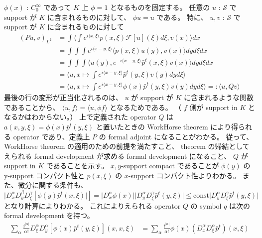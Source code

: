 \begin{Proof}
\itemprof
  \(\phi(x)\) : \(C^\infty_0\) であって \(K\) 上 \(\phi = 1\) となるものを固定する。
  任意の \(u\) : \(\mathscr{S}\) で support が \(K\) に含まれるものに対して、 \(\phi u = u\) である。
  特に、 \(u,v\) : \(\mathscr{S}\) で support が \(K\) に含まれるものに対して
  \begin{align*}
    (Pu , v)_{L^2}
    &= \int \langle \int e^{i \langle x , \xi \rangle} p(x , \xi) \mathscr{F}[u](\xi) d\xi , v(x) \rangle dx \\
    &= \int \int \int e^{i \langle x - y , \xi \rangle} \langle p(x , \xi) u(y) , v(x) \rangle dy d\xi dx \\
    &= \int \int \int \langle u(y) , e^{- i \langle x - y , \xi \rangle} \bar{p}^t(x,\xi) v(x) \rangle dy d\xi dx \\
    &= \langle u , x \mapsto \int e^{i \langle x - y , \xi \rangle} \bar{p}^t(y,\xi) v(y) dy d\xi \rangle \\
    &= \langle u , x \mapsto \int e^{i \langle x - y , \xi \rangle} \phi(x) \bar{p}^t(y,\xi) v(y) dy d\xi \rangle
    =: \langle u , Q v \rangle
  \end{align*}
  最後の行の変形が正当化されるのは、 \(u\) が support が \(K\) に含まれるような関数であることから、 \(\langle u , f \rangle = \langle u , \phi f \rangle\) となるためである。
  （ \(f\) 側が support in \(K\) となるかはわからない。）
  上で定義された operator \(Q\) は \(a(x,y,\xi) = \phi(x) \bar{p}^t(y,\xi)\) と置いたときの WorkHorse theorem により得られる operator であり、定義上 \(P\) の formal adjoint になることがわかる。
  従って、 WorkHorse theorem の適用のための前提を満たすこと、 theorem の帰結としてえられる formal development が求める formal development になること、 \(Q\) が support in \(K\) であることを示す。
\itemthen
  \(x,y\)-support compact であることが \(\phi(y)\) の y-support コンパクト性と \(p(x,\xi)\) の \(x\)-support コンパクト性よりわかる。
  また、微分に関する条件も、 \(\lvert D^\alpha_x D^\beta_y D^\gamma_\xi [\phi(y) \bar{p}^t(x,\xi) \rvert] = \lvert D^\alpha_x \phi(x) \rvert \lvert D^\alpha_y D^\gamma_\xi \bar{p}^t(y,\xi) \rvert \leq \text{const} \lvert D^\alpha_y D^\gamma_\xi \bar{p}^t(y,\xi) \rvert\) となり計算によりわかる。
  これによりえられる operator \(Q\) の symbol \(q\) は次の formal development を持つ。
  \begin{align*}
    \sum_{\alpha} \frac{i^{\lvert \alpha \rvert}}{\alpha !} D^\alpha_\xi D^\alpha_y [\phi(x) \bar{p}^t(y,\xi)](x,x,\xi)
    &= \sum_{\alpha} \frac{i^{\lvert \alpha \rvert}}{\alpha !} \phi(x) (D^\alpha_x D^\alpha_\xi \bar{p}^t)(x , \xi) \\

\end{align*}
\end{Proof}
